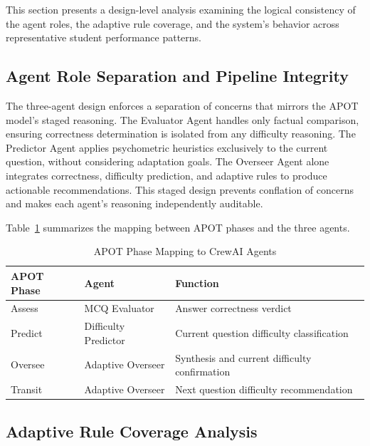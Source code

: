 \documentclass[conference]{IEEEtran}
\begin{document}
This section presents a design-level analysis examining the logical consistency of the agent roles, the adaptive rule coverage, and the system's behavior across representative student performance patterns.

\subsection{Agent Role Separation and Pipeline Integrity}

The three-agent design enforces a separation of concerns that mirrors the APOT model's staged reasoning. The Evaluator Agent handles only factual comparison, ensuring correctness determination is isolated from any difficulty reasoning. The Predictor Agent applies psychometric heuristics exclusively to the current question, without considering adaptation goals. The Overseer Agent alone integrates correctness, difficulty prediction, and adaptive rules to produce actionable recommendations. This staged design prevents conflation of concerns and makes each agent's reasoning independently auditable.

Table~\ref{tab:agent_roles} summarizes the mapping between APOT phases and the three agents.

\begin{table}[htbp]
\caption{APOT Phase Mapping to CrewAI Agents}
\label{tab:agent_roles}
\centering
\renewcommand{\arraystretch}{1.2}
\begin{tabular}{|>{\centering\arraybackslash}m{1.5cm}|
                 >{\centering\arraybackslash}m{2.5cm}|
                 >{\raggedright\arraybackslash}m{3.0cm}|}
\hline
\textbf{APOT Phase} & \textbf{Agent} & \textbf{Function} \\
\hline
Assess   & MCQ Evaluator         & Answer correctness verdict \\
\hline
Predict  & Difficulty Predictor  & Current question difficulty classification \\
\hline
Oversee  & Adaptive Overseer     & Synthesis and current difficulty confirmation \\
\hline
Transit  & Adaptive Overseer     & Next question difficulty recommendation \\
\hline
\end{tabular}
\end{table}

\subsection{Adaptive Rule Coverage Analysis}
\end{document}
